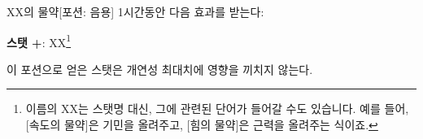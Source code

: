 \documentclass{report}
\begin{document}
	\begin{story}{XX의 물약}{[포션: 음용]}
		1시간동안 다음 효과를 받는다:
		
		\textbf{스탯 +}: XX\footnote{이름의 XX는 스탯명 대신, 그에 관련된 단어가 들어갈 수도 있습니다. 예를 들어, [속도의 물약]은 기민을 올려주고, [힘의 물약]은 근력을 올려주는 식이죠.}
		
		이 포션으로 얻은 스탯은 개연성 최대치에 영향을 끼치지 않는다.
		
	\end{story}
\end{document}

